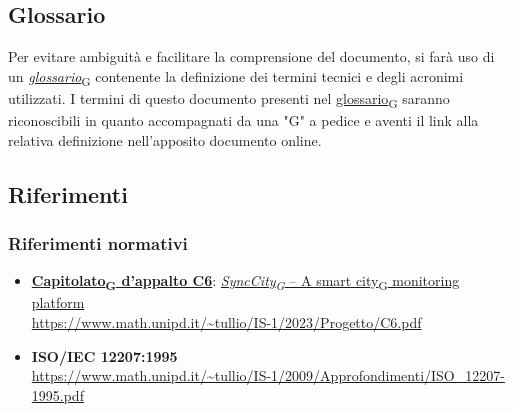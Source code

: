 \subsection{Glossario}
Per evitare ambiguità e facilitare la comprensione del documento, si farà uso di un \href{https://7last.github.io/docs/rtb/documentazione-interna/glossario\#glossario}{\textit{glossario}\textsubscript{G}} contenente la definizione dei termini tecnici e degli acronimi utilizzati. I termini di questo documento presenti nel \href{https://7last.github.io/docs/rtb/documentazione-interna/glossario\#glossario}{glossario\textsubscript{G}} saranno riconoscibili in quanto accompagnati da una "G" a pedice e aventi il link alla relativa definizione nell'apposito documento online.

\subsection{Riferimenti}
\subsubsection{Riferimenti normativi}
\begin{itemize}
	\item \href{https://7last.github.io/docs/rtb/documentazione-interna/glossario\#capitolato}{\textbf{Capitolato\textsubscript{G} d'appalto C6}}: \href{https://7last.github.io/docs/rtb/documentazione-interna/glossario\#synccity}{\textit{SyncCity\textsubscript{G} } – A \href{https://7last.github.io/docs/rtb/documentazione-interna/glossario\#smart-city}{smart city\textsubscript{G}} monitoring platform}\\
    \url{https://www.math.unipd.it/~tullio/IS-1/2023/Progetto/C6.pdf}
	\item \textbf{ISO/IEC 12207:1995} \\ \url{https://www.math.unipd.it/~tullio/IS-1/2009/Approfondimenti/ISO_12207-1995.pdf}
\end{itemize}

